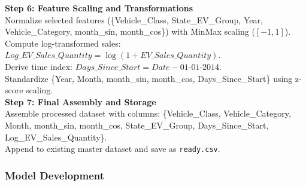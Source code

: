 \documentclass[pdflatex,sn-mathphys-num]{sn-jnl}%
\begin{document}
\begin{algorithm}[H]
\textbf{Step 6: Feature Scaling and Transformations} \\
Normalize selected features (\{Vehicle\_Class, State\_EV\_Group, Year, Vehicle\_Category, month\_sin, month\_cos\}) with MinMax scaling ($[-1,1]$).
Compute log-transformed sales: \\
$Log\_EV\_Sales\_Quantity = \log(1+EV\_Sales\_Quantity)$. \\
Derive time index: $Days\_Since\_Start = Date - 01\text{-}01\text{-}2014$. \\
Standardize \{Year, Month, month\_sin, month\_cos, Days\_Since\_Start\} using z-score scaling. \\

\textbf{Step 7: Final Assembly and Storage} \\
Assemble processed dataset with columns: \{Vehicle\_Class, Vehicle\_Category, Month, month\_sin, month\_cos, State\_EV\_Group, Days\_Since\_Start, Log\_EV\_Sales\_Quantity\}. \\
Append to existing master dataset and save as \texttt{ready.csv}. \\

\end{algorithm}

\subsubsection{Model Development}
\end{document}
